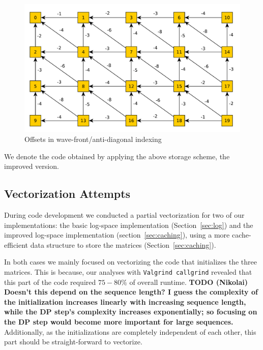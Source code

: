 \documentclass[runningheads,a4paper]{llncs}
\begin{document}
\begin{figure}
\centering
\includegraphics[scale=0.5]{images/unnamed0.pdf}
\caption{Offsets in wave-front/anti-diagonal indexing}
\label{fig:offset}
\end{figure}


We denote the code obtained by applying the above storage scheme, the improved version.

\subsection{Vectorization Attempts}
\label{sec:vector}
During code development we conducted a partial vectorization for two of our implementations: 
the basic log-space implementation (Section~\ref{sec:log}) and the improved log-space implementation (section~\ref{sec:caching}), using a more 
cache-efficient data structure to store the matrices (Section~\ref{sec:caching}).

In both cases we mainly focused on vectorizing the code that initializes the three matrices. 
This is because, our analyses with \texttt{Valgrind callgrind} revealed that this 
part of the code required $75-80\%$ of overall runtime. 
\textbf{TODO (Nikolai) Doesn't this depend on the sequence length? I guess the
  complexity of the initialization increases linearly with increasing sequence length, while the
  DP step's complexity increases exponentially; so focusing on the DP step would
  become more important for large sequences.}
Additionally, as the initializations are completely independent of each other, this part should be straight-forward to vectorize.
\end{document}
